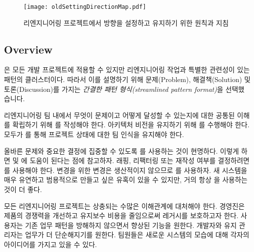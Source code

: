 \documentclass[a4paper,10pt,twoside]{book}
\begin{document}
\begin{figure}
\begin{center}
\texttt{[image: oldSettingDirectionMap.pdf]}
\caption{리엔지니어링 프로젝트에서 방향을 설정하고 유지하기 위한 원칙과 지침}
\end{center}
\end{figure}

\subsection*{Overview}

은 모든 개발 프로젝트에 적용할 수 있지만 리엔지니어링 작업과 특별한 관련성이 있는 패턴의 클러스터이다. 따라서 이를 설명하기 위해 문제(Problem), 해결책(Solution) 및 토론(Discussion)를 가지는 \emph{간결한 패턴 형식(streamlined pattern format)}을 선택했습니다.

리엔지니어링 팀 내에서 무엇이 문제이고 어떻게 달성할 수 있는지에 대한 공통된 이해를 확립하기 위해 를 작성해야 한다. 아키텍처 비전을 유지하기 위해 를 수행해야 한다. 모두가 를 통해 프로젝트 상태에 대한 팀 인식을 유지해야 한다.

올바른 문제와 중요한 결정에 집중할 수 있도록 를 사용하는 것이 현명하다. 이렇게 하면  및 에 도움이 된다는 점에 참고하자. 래핑, 리팩터링 또는 재작성 여부를 결정하려면 를 사용해야 한다. 변경을 위한 변경은 생산적이지 않으므로 를 사용하자. 새 시스템을 매우 유연하고 범용적으로 만들고 싶은 유혹이 있을 수 있지만, 거의 항상 을 사용하는 것이 더 좋다.




\discussion
모든 리엔지니어링 프로젝트는 상충되는 수많은 이해관계에 대처해야 한다. 경영진은 제품의 경쟁력을 개선하고 유지보수 비용을 줄임으로써 레거시를 보호하고자 한다. 사용자는 기존 업무 패턴을 방해하지 않으면서 향상된 기능을 원한다. 개발자와 유지 관리자는 업무가 더 단순해지기를 원한다. 팀원들은 새로운 시스템의 모습에 대해 각자의 아이디어를 가지고 있을 수 있다.
\end{document}
